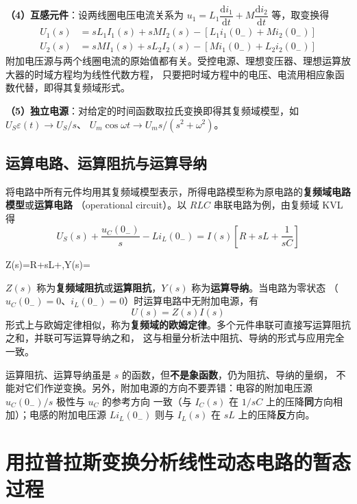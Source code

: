 \textbf{（4）互感元件}：设两线圈电压电流关系为 $u_1=L_1\dfrac{\mathrm{d}i_1}{\mathrm{d}t}
+M\dfrac{\mathrm{d}i_2}{\mathrm{d}t}$ 等，取变换得
\begin{align}
  U_1(s)&=sL_1I_1(s)+sMI_2(s)-\left[L_1i_1(0_-)+Mi_2(0_-)\right]\\
  U_2(s)&=sMI_1(s)+sL_2I_2(s)-\left[Mi_1(0_-)+L_2i_2(0_-)\right]
\end{align}
附加电压源与两个线圈电流的原始值都有关。受控电源、理想变压器、理想运算放大器的时域方程均为线性代数方程，
只要把时域方程中的电压、电流用相应象函数代替，即得其复频域形式。

\textbf{（5）独立电源}：对给定的时间函数取拉氏变换即得其复频域模型，如 $U_S\varepsilon(t)\to U_S/s$、
$U_m\cos\omega t\to U_m s/(s^2+\omega^2)$。

\subsection{运算电路、运算阻抗与运算导纳}
将电路中所有元件均用其复频域模型表示，所得电路模型称为原电路的\textbf{复频域电路模型}或\textbf{运算电路}
（operational circuit）。以 $RLC$ 串联电路为例，由复频域 KVL 得
\begin{equation}
  U_S(s)+\frac{u_C(0_-)}{s}-Li_L(0_-)=I(s)\left[R+sL+\frac{1}{sC}\right]
\end{equation}
\begin{keyformula}{Z(s)=R+sL+,\qquad Y(s)=}
\end{keyformula}
$Z(s)$ 称为\textbf{复频域阻抗}或\textbf{运算阻抗}，$Y(s)$ 称为\textbf{运算导纳}。当电路为零状态
（$u_C(0_-)=0$、$i_L(0_-)=0$）时运算电路中无附加电源，有
\begin{equation}
  U(s)=Z(s)I(s)
\end{equation}
形式上与欧姆定律相似，称为\textbf{复频域的欧姆定律}。多个元件串联可直接写运算阻抗之和，并联可写运算导纳之和，
这与相量分析法中阻抗、导纳的形式与应用完全一致。

\begin{corepoint}{运算阻抗、运算导纳虽是 $s$ 的函数，但\textbf{不是象函数}，仍为阻抗、导纳的量纲，
不能对它们作逆变换。另外，附加电源的方向不要弄错：电容的附加电压源 $u_C(0_-)/s$ 极性与 $u_C$ 的参考方向
一致（与 $I_C(s)$ 在 $1/sC$ 上的压降\textbf{同}方向相加）；电感的附加电压源 $Li_L(0_-)$ 则与
$I_L(s)$ 在 $sL$ 上的压降\textbf{反}方向。}
\end{corepoint}

\section{用拉普拉斯变换分析线性动态电路的暂态过程}

